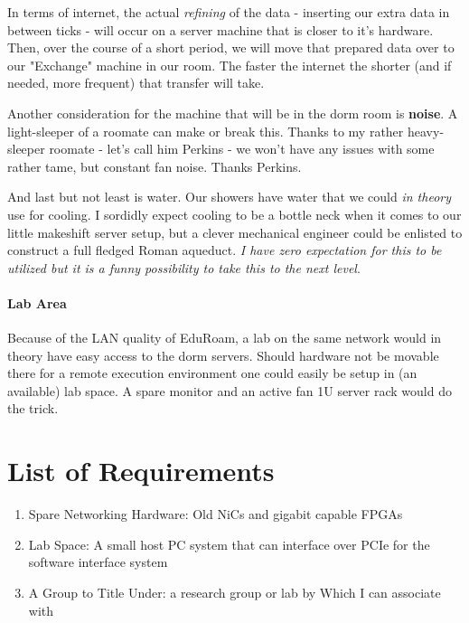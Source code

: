 \documentclass[12pt]{article}
\begin{document}
In terms of internet, the actual \emph{refining} of the data - inserting our extra data in between ticks - will occur
on a server machine that is closer to it's hardware. Then, over the course of a short period, we will move that prepared
data over to our "Exchange" machine in our room. The faster the internet the shorter (and if needed, more frequent) that transfer will take.

Another consideration for the machine that will be in the dorm room is \textbf{noise}. A light-sleeper of a roomate can 
make or break this. Thanks to my rather heavy-sleeper roomate - let's call him Perkins - we won't have any issues with 
some rather tame, but constant fan noise. Thanks Perkins.

And last but not least is water. Our showers have water that we could \emph{in theory} use for cooling.
I sordidly expect cooling to be a bottle neck when it comes to our little makeshift server setup, but a
clever mechanical engineer could be enlisted to construct a full fledged Roman aqueduct. \emph{I have 
zero expectation for this to be utilized but it is a funny possibility to take this to the next level}.

\paragraph{Lab Area}


Because of the LAN quality of EduRoam, a lab on the same network would in theory have easy
access to the dorm servers. Should hardware not be movable there for a remote execution environment
one could easily be setup in (an available) lab space. A spare monitor and an active fan 1U server
rack would do the trick.



\clearpage
\section*{List of Requirements}

\begin{enumerate}
  \item{Spare Networking Hardware: Old NiCs and gigabit capable FPGAs}
  \item{Lab Space: A small host PC system that can interface over PCIe for the software interface system}
  \item{A Group to Title Under: a research group or lab by Which I can associate with}
\end{enumerate}
\end{document}
